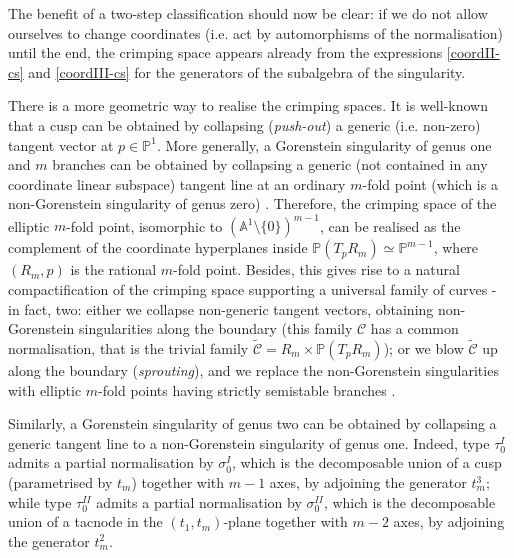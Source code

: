 \documentclass[11pt]{amsart}
\newcommand{\PP}{\mathbb P}
\newcommand{\Aaff}{\mathbb A}
\theoremstyle{plain}
\theoremstyle{definition}
\begin{document}
The benefit of a two-step classification should now be clear: if we do not allow ourselves to change coordinates (i.e. act by automorphisms of the normalisation) until the end, the crimping space appears already from the expressions \eqref{coordII-cs} and \eqref{coordIII-cs} for the generators of the subalgebra of the singularity.

\smallskip

There is a more geometric way to realise the crimping spaces. It is well-known that a cusp can be obtained by collapsing (\emph{push-out}) a generic (i.e. non-zero) tangent vector at $p\in\PP^1$. More generally, a Gorenstein singularity of genus one and $m$ branches can be obtained by collapsing a generic (not contained in any coordinate linear subspace) tangent line at an ordinary $m$-fold point (which is a non-Gorenstein singularity of genus zero) \cite[Lemma 2.2]{SMY1}. Therefore, the crimping space of the elliptic $m$-fold point, isomorphic to $(\Aaff^1\setminus\{0\})^{m-1}$, can be realised as the complement of the coordinate hyperplanes inside $\PP(T_pR_m)\simeq\PP^{m-1}$, where $(R_m,p)$ is the rational $m$-fold point. Besides, this gives rise to a natural compactification of the crimping space supporting a universal family of curves - in fact, two: either we collapse non-generic tangent vectors, obtaining non-Gorenstein singularities along the boundary (this family $\mathcal C$ has a common normalisation, that is the trivial family $\widetilde{\mathcal C}=R_m\times \PP(T_pR_m)$); or we blow $\widetilde{\mathcal C}$ up along the boundary (\emph{sprouting}), and we replace the non-Gorenstein singularities with elliptic $m$-fold points having strictly semistable branches \cite[\S 2.2-3]{SMY2}.

Similarly, a Gorenstein singularity of genus two can be obtained by collapsing a generic tangent line to a non-Gorenstein singularity of genus one. Indeed, type $\tau_0^{I}$ admits a partial normalisation by $\sigma_0^{I}$, which is the decomposable union of a cusp (parametrised by $t_m$) together with $m-1$ axes, by adjoining the generator $t_m^3$; while type $\tau_0^{I\!I}$ admits a partial normalisation by $\sigma_0^{I\!I}$, which is the decomposable union of a tacnode in the $(t_1,t_m)$-plane together with $m-2$ axes, by adjoining the generator $t_m^2$.
\end{document}
